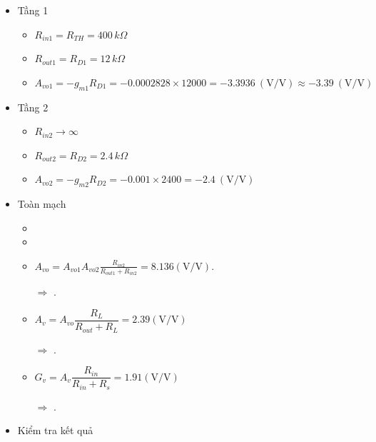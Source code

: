 \begin{itemize}[label=-]
	\item Tầng 1
	\begin{itemize}[label=+, leftmargin=2cm]
		\item \( R_{in1} = R_{TH} = 400\,k\Omega \)
		\item \( R_{out1} = R_{D1} = 12\,k\Omega \)
		\item \( A_{vo1} = -g_{m1} R_{D1}
		= -0.0002828 \times 12000
		= -3.3936 \ (\text{V/V})
		\approx -3.39\ (\text{V/V}) \)
	\end{itemize}
	
	\item Tầng 2
	\begin{itemize}[label=+, leftmargin=2cm]
		\item \( R_{in2} \to \infty \)
		\item \( R_{out2} = R_{D2} = 2.4\,k\Omega \)
		\item \( A_{vo2} = -g_{m2} R_{D2}
		= -0.001 \times 2400
		= -2.4\ (\text{V/V}) \)
	\end{itemize}
	
	\item Toàn mạch
	\begin{itemize}[label=+, leftmargin=2cm]
		\item {}
		
		\item {}
		
		\item $	A_{vo} = A_{vo1} A_{vo2}\frac{R_{in2}}{R_{out1}+R_{in2}} = 8.136 (\text{V/V}).$
		
		$\Rightarrow$ .
		
		\item $ A_{v} = A_{vo}\dfrac{R_{L}}{R_{out} + R_{L}} = 2.39 (\text{V/V})$
		
		$\Rightarrow$ .
		
		\item $G_{v} = A_{v} \dfrac{R_{in}}{R_{in} + R_{s}} = 1.91 (\text{V/V})$
		
		$\Rightarrow$ .
	\end{itemize}
	
	\item Kiểm tra kết quả
	

\end{itemize}
